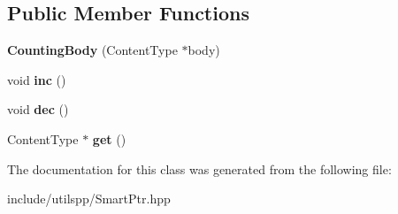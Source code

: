 \subsection*{Public Member Functions}
\begin{DoxyCompactItemize}
\item 
\hypertarget{classutilspp_1_1CountingBody_a1cdd0127a4df9faacebcf6e6485a17d0}{{\bfseries Counting\-Body} (Content\-Type $\ast$body)}\label{classutilspp_1_1CountingBody_a1cdd0127a4df9faacebcf6e6485a17d0}

\item 
\hypertarget{classutilspp_1_1CountingBody_ab614dec16baa509684b7ff64d8f1ab0e}{void {\bfseries inc} ()}\label{classutilspp_1_1CountingBody_ab614dec16baa509684b7ff64d8f1ab0e}

\item 
\hypertarget{classutilspp_1_1CountingBody_a9a5eee9f042935a08b526c4dd4191b74}{void {\bfseries dec} ()}\label{classutilspp_1_1CountingBody_a9a5eee9f042935a08b526c4dd4191b74}

\item 
\hypertarget{classutilspp_1_1CountingBody_ae6305c6f6e5765cecb318c2047994ab5}{Content\-Type $\ast$ {\bfseries get} ()}\label{classutilspp_1_1CountingBody_ae6305c6f6e5765cecb318c2047994ab5}

\end{DoxyCompactItemize}


The documentation for this class was generated from the following file\-:\begin{DoxyCompactItemize}
\item 
include/utilspp/Smart\-Ptr.\-hpp\end{DoxyCompactItemize}
